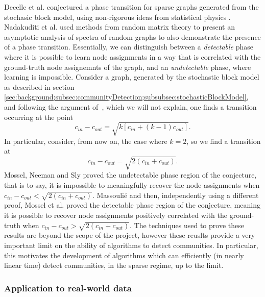 \documentclass[12pt]{article}
\numberwithin{equation}{section}
\begin{document}
Decelle et al. \cite{DKM+11} conjectured a phase transition for sparse graphs generated from the stochasic block model, using non-rigorous ideas from statistical physics \cite{MNS12}. Nadakuditi et al. \cite{NN12} used methods from random matrix theory to present an asymptotic analysis of spectra of random graphs to also demonstrate the presence of a phase transition. Essentially, we can distinguish between a \textit{detectable} phase where it is possible to learn node assignments in a way that is correlated with the ground-truth node assignemnts of the graph, and an \textit{undetectable} phase, where learning is impossible. Consider a graph, generated by the stochastic block model as described in section \ref{sec:background;subsec:communityDetection;subsubsec:stochasticBlockModel}, and following the argument of~\cite{NN12}, which we will not explain, one finds a transition occurring at the point
\begin{equation}
\label{eq:phaseTransitionK}
	c_{in} - c_{out} = \sqrt{k[c_{in} + (k-1)c_{out}]}.
\end{equation}
In particular, consider, from now on, the case where $k = 2$, so we find a transition at
\begin{equation}
\label{eq:phaseTransitionK}
	c_{in} - c_{out} = \sqrt{2(c_{in} + c_{out})}.
\end{equation}
Mossel, Neeman and Sly \cite{MNS12} proved the undetectable phase region of the conjecture, that is to say, it is impossible to meaningfully recover the node assignments when $ c_{in} - c_{out} < \sqrt{2(c_{in} + c_{out})}$. Massouli\'e \cite{Mas13} and then, independently using a different proof, Mossel et al. \cite{MNS13b} proved the detectable phase region of the conjecture, meaning it is possible to recover node assignments positively correlated with the ground-truth when $ c_{in} - c_{out} > \sqrt{2(c_{in} + c_{out})}$. The techniques used to prove these results are beyond the scope of the project, however these reuslts provide a very important limit on the ability of algorithms to detect communities. In particular, this motivates the development of algorithms which can efficiently (in nearly linear time) detect communities, in the sparse regime, up to the limit.

\subsubsection{Application to real-world data}
\label{sec:background;subsec:communityDetection;subsubsec:applicationToRealWorldData}
\end{document}
